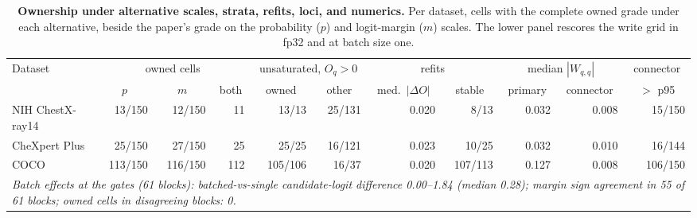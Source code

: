 \begin{table}[h]
\centering
\scriptsize
\setlength{\tabcolsep}{4pt}
\caption{\textbf{Ownership under alternative scales, strata, refits, loci, and numerics.} Per dataset, cells with the complete owned grade under each alternative, beside the paper's grade on the probability ($p$) and logit-margin ($m$) scales. The lower panel rescores the write grid in fp32 and at batch size one.}
\label{tab:cf-scale}
\begin{tabular}{lrrrrrrrrrr}
\toprule
\multirow{2}{*}{Dataset} & \multicolumn{3}{c}{owned cells} & \multicolumn{2}{c}{unsaturated, $O_q>0$} & \multicolumn{2}{c}{refits} & \multicolumn{2}{c}{median $|W_{q,q}|$} & \multicolumn{1}{c}{connector}\\
\cmidrule(lr){2-4}\cmidrule(lr){5-6}\cmidrule(lr){7-8}\cmidrule(lr){9-10}
& \multicolumn{1}{c}{$p$} & \multicolumn{1}{c}{$m$} & \multicolumn{1}{c}{both} & \multicolumn{1}{c}{owned} & \multicolumn{1}{c}{other} & \multicolumn{1}{c}{med.\ $|\Delta O|$} & \multicolumn{1}{c}{stable} & \multicolumn{1}{c}{primary} & \multicolumn{1}{c}{connector} & \multicolumn{1}{c}{$>$ p95}\\
\midrule
NIH ChestX-ray14 & 13/150 & 12/150 & 11 & 13/13 & 25/131 & 0.020 & 8/13 & 0.032 & 0.008 & 15/150 \\
CheXpert Plus & 25/150 & 27/150 & 25 & 25/25 & 16/121 & 0.023 & 10/25 & 0.032 & 0.010 & 16/144 \\
COCO & 113/150 & 116/150 & 112 & 105/106 & 16/37 & 0.020 & 107/113 & 0.127 & 0.008 & 106/150 \\
\midrule
\multicolumn{11}{p{0.9\linewidth}}{\textit{Batch effects at the gates (61 blocks): batched-vs-single candidate-logit difference 0.00--1.84 (median 0.28); margin sign agreement in 55 of 61 blocks; owned cells in disagreeing blocks: 0.}} \\
\bottomrule
\end{tabular}


\end{table}
